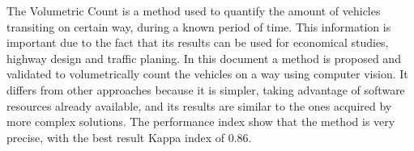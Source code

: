 
The Volumetric Count is a method used to quantify the amount of vehicles transiting on certain way, during a known period of time. This information is important due to the fact that its results can be used for economical studies, highway design and traffic planing. In this document a method is proposed and validated to volumetrically count the vehicles on a way using computer vision. It differs from other approaches because it is simpler, taking advantage of software resources already available, and its results are similar to the ones acquired by more complex solutions. The performance index show that the method is very precise, with the best result Kappa index of 0.86.


